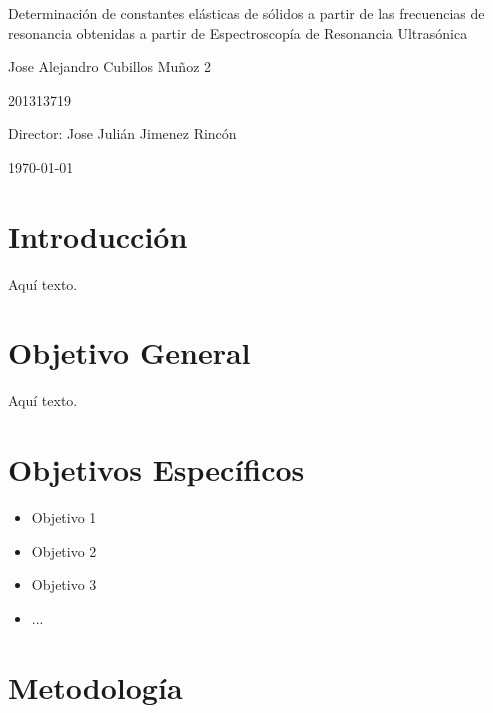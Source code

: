 \documentclass[12pt]{article}
\begin{document}
\begin{center}
\Huge
Determinación de constantes elásticas de sólidos a partir de las frecuencias de resonancia obtenidas a partir de Espectroscopía de Resonancia Ultrasónica

\vspace{3mm}
\Large Jose Alejandro Cubillos Muñoz 2

\large
201313719


\vspace{2mm}
\Large
Director: Jose Julián Jimenez Rincón

\normalsize
\vspace{2mm}

\today
\end{center}


\normalsize
\section{Introducción}


Aqu\'i texto.


\section{Objetivo General}


Aqu\'i texto.


\section{Objetivos Específicos}


\begin{itemize}
	\item Objetivo 1
	\item Objetivo 2
	\item Objetivo 3
	\item ...
\end{itemize}

\section{Metodología}
\end{document}

